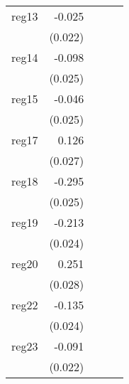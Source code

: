 {\begin{longtable}{l*{4}{D{.}{.}{-1}}}
\addlinespace
reg13       &      -0.025         &                     &                     &                     \\
            &     (0.022)         &                     &                     &                     \\
\addlinespace
reg14       &      -0.098\sym{***}&                     &                     &                     \\
            &     (0.025)         &                     &                     &                     \\
\addlinespace
reg15       &      -0.046         &                     &                     &                     \\
            &     (0.025)         &                     &                     &                     \\
\addlinespace
reg17       &       0.126\sym{***}&                     &                     &                     \\
            &     (0.027)         &                     &                     &                     \\
\addlinespace
reg18       &      -0.295\sym{***}&                     &                     &                     \\
            &     (0.025)         &                     &                     &                     \\
\addlinespace
reg19       &      -0.213\sym{***}&                     &                     &                     \\
            &     (0.024)         &                     &                     &                     \\
\addlinespace
reg20       &       0.251\sym{***}&                     &                     &                     \\
            &     (0.028)         &                     &                     &                     \\
\addlinespace
reg22       &      -0.135\sym{***}&                     &                     &                     \\
            &     (0.024)         &                     &                     &                     \\
\addlinespace
reg23       &      -0.091\sym{***}&                     &                     &                     \\
            &     (0.022)         &                     &                     &                     \\

\end{longtable}}
